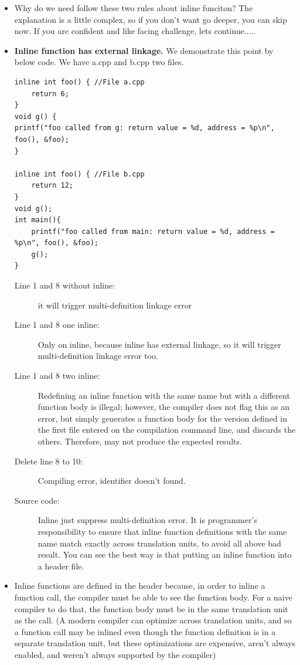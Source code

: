 \documentclass[a4paper,11pt,twoside]{book}
\begin{document}
\begin{itemize}
	\item Why do we need follow these two rules about inline funciton? The explanation is a little complex, so if you don't want go deeper, you can skip now. If you are confident and like facing challenge, lets continue.....
	
	\item \textbf{Inline function has external linkage.} We demonstrate this point by below code. We have a.cpp and b.cpp two files.
\begin{lstlisting}
inline int foo() { //File a.cpp
	return 6;
}
void g() {
printf("foo called from g: return value = %d, address = %p\n", foo(), &foo);
}

inline int foo() { //File b.cpp
	return 12;
}
void g();
int main(){
	printf("foo called from main: return value = %d, address = %p\n", foo(), &foo);
	g();
}
\end{lstlisting} 
\begin{description}
	\item[Line 1 and 8 without inline:] it will trigger multi-definition linkage error
	\item[Line 1 and 8 one inline:] Only on inline, because inline has external linkage, so it will trigger multi-definition linkage error too.
	\item[Line 1 and 8 two inline:] Redefining an inline function with the same name but with a different function body is illegal; however, the compiler does not flag this as an error, but simply generates a function body for the version defined in the first file entered on the compilation command line, and discards the others. Therefore, may not produce the expected results.
	\item[Delete line 8 to 10:] Compiling error, identifier doesn't found.
	\item[Source code:]  Inline just suppress multi-definition error. It is programmer's responsibility to ensure that inline function definitions with the same name match exactly across translation units, to avoid all above bad result. You can see the best way is that putting an inline function into a header file.
\end{description}

	\item Inline functions are defined in the header because, in order to inline a function call, the compiler must be able to see the function body. For a naive compiler to do that, the function body must be in the same translation unit as the call. (A modern compiler can optimize across translation units, and so a function call may be inlined even though the function definition is in a separate translation unit, but these optimizations are expensive, aren't always enabled, and weren't always supported by the compiler)
	

\end{itemize}
\end{document}
